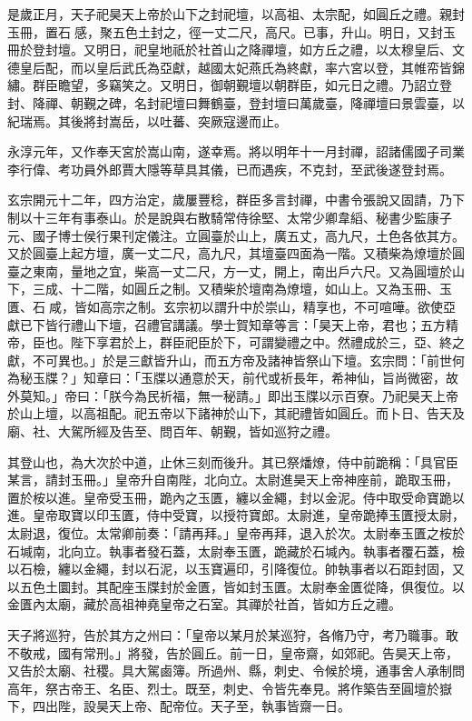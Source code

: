 \begin{pinyinscope}
 是歲正月，天子祀昊天上帝於山下之封祀壇，以高祖、太宗配，如圓丘之禮。親封玉冊，置石感，聚五色土封之，徑一丈二尺，高尺。已事，升山。明日，又封玉冊於登封壇。又明日，祀皇地祇於社首山之降禪壇，如方丘之禮，以太穆皇后、文德皇后配，而以皇后武氏為亞獻，越國太妃燕氏為終獻，率六宮以登，其帷帟皆錦繡。群臣瞻望，多竊笑之。又明日，御朝覲壇以朝群臣，如元日之禮。乃詔立登封、降禪、朝覲之碑，名封祀壇曰舞鶴臺，登封壇曰萬歲臺，降禪壇曰景雲臺，以紀瑞焉。其後將封嵩岳，以吐蕃、突厥寇邊而止。



 永淳元年，又作奉天宮於嵩山南，遂幸焉。將以明年十一月封禪，詔諸儒國子司業李行偉、考功員外郎賈大隱等草具其儀，已而遇疾，不克封，至武後遂登封焉。



 玄宗開元十二年，四方治定，歲屢豐稔，群臣多言封禪，中書令張說又固請，乃下制以十三年有事泰山。於是說與右散騎常侍徐堅、太常少卿韋縚、秘書少監康子元、國子博士侯行果刊定儀注。立圓臺於山上，廣五丈，高九尺，土色各依其方。又於圓臺上起方壇，廣一丈二尺，高九尺，其壇臺四面為一階。又積柴為燎壇於圓臺之東南，量地之宜，柴高一丈二尺，方一丈，開上，南出戶六尺。又為圓壇於山下，三成、十二階，如圓丘之制。又積柴於壇南為燎壇，如山上。又為玉冊、玉匱、石咸，皆如高宗之制。玄宗初以謂升中於崇山，精享也，不可喧嘩。欲使亞獻已下皆行禮山下壇，召禮官講議。學士賀知章等言：「昊天上帝，君也；五方精帝，臣也。陛下享君於上，群臣祀臣於下，可謂變禮之中。然禮成於三，亞、終之獻，不可異也。」於是三獻皆升山，而五方帝及諸神皆祭山下壇。玄宗問：「前世何為秘玉牒？」知章曰：「玉牒以通意於天，前代或祈長年，希神仙，旨尚微密，故外莫知。」帝曰：「朕今為民祈福，無一秘請。」即出玉牒以示百寮。乃祀昊天上帝於山上壇，以高祖配。祀五帝以下諸神於山下，其祀禮皆如圓丘。而卜日、告天及廟、社、大駕所經及告至、問百年、朝覲，皆如巡狩之禮。



 其登山也，為大次於中道，止休三刻而後升。其已祭燔燎，侍中前跪稱：「具官臣某言，請封玉冊。」皇帝升自南陛，北向立。太尉進昊天上帝神座前，跪取玉冊，置於桉以進。皇帝受玉冊，跪內之玉匱，纏以金繩，封以金泥。侍中取受命寶跪以進。皇帝取寶以印玉匱，侍中受寶，以授符寶郎。太尉進，皇帝跪捧玉匱授太尉，太尉退，復位。太常卿前奏：「請再拜。」皇帝再拜，退入於次。太尉奉玉匱之桉於石堿南，北向立。執事者發石蓋，太尉奉玉匱，跪藏於石堿內。執事者覆石蓋，檢以石檢，纏以金繩，封以石泥，以玉寶遍印，引降復位。帥執事者以石距封固，又以五色土圜封。其配座玉牒封於金匱，皆如封玉匱。太尉奉金匱從降，俱復位。以金匱內太廟，藏於高祖神堯皇帝之石室。其禪於社首，皆如方丘之禮。



 天子將巡狩，告於其方之州曰：「皇帝以某月於某巡狩，各脩乃守，考乃職事。敢不敬戒，國有常刑。」將發，告於圓丘。前一日，皇帝齋，如郊祀。告昊天上帝，又告於太廟、社稷。具大駕鹵簿。所過州、縣，刺史、令候於境，通事舍人承制問高年，祭古帝王、名臣、烈士。既至，刺史、令皆先奉見。將作築告至圓壇於嶽下，四出陛，設昊天上帝、配帝位。天子至，執事皆齋一日。




\end{pinyinscope}
